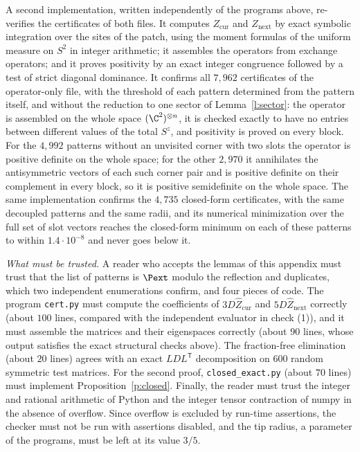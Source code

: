 A second implementation, written independently of the programs above, re-verifies the certificates of both files. It computes $Z_{\mathrm{cur}}$ and $Z_{\mathrm{next}}$ by exact symbolic integration over the sites of the patch, using the moment formulas of the uniform measure on $S^2$ in integer arithmetic; it assembles the operators from exchange operators; and it proves positivity by an exact integer congruence followed by a test of strict diagonal dominance. It confirms all $7{, }962$ certificates of the operator-only file, with the threshold of each pattern determined from the pattern itself, and without the reduction to one sector of Lemma~\ref{l:sector}: the operator is assembled on the whole space $(\C^2)^{\otimes n}$, it is checked exactly to have no entries between different values of the total $S^z$, and positivity is proved on every block. For the $4{, }992$ patterns without an unvisited corner with two slots the operator is positive definite on the whole space; for the other $2{, }970$ it annihilates the antisymmetric vectors of each such corner pair and is positive definite on their complement in every block, so it is positive semidefinite on the whole space. The same implementation confirms the $4{, }735$ closed-form certificates, with the same decoupled patterns and the same radii, and its numerical minimization over the full set of slot vectors reaches the closed-form minimum on each of these patterns to within $1.4 \cdot 10^{-8}$ and never goes below it.

\emph{What must be trusted.} A reader who accepts the lemmas of this appendix must trust that the list of patterns is $\Pext$ modulo the reflection and duplicates, which two independent enumerations confirm, and four pieces of code. The program \texttt{cert.py} must compute the coefficients of $3 D \hat Z_{\mathrm{cur}}$ and $5 D \hat Z_{\mathrm{next}}$ correctly (about $100$ lines, compared with the independent evaluator in check (1)), and it must assemble the matrices and their eigenspaces correctly (about $90$ lines, whose output satisfies the exact structural checks above). The fraction-free elimination (about $20$ lines) agrees with an exact $LDL^{\mathsf T}$ decomposition on $600$ random symmetric test matrices. For the second proof, \texttt{closed\_exact.py} (about $70$ lines) must implement Proposition~\ref{p:closed}. Finally, the reader must trust the integer and rational arithmetic of Python and the integer tensor contraction of numpy in the absence of overflow. Since overflow is excluded by run-time assertions, the checker must not be run with assertions disabled, and the tip radius, a parameter of the programs, must be left at its value $3/5$.

